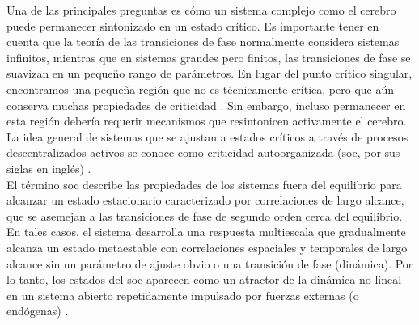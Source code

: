 Una de las principales preguntas es cómo un sistema complejo como el cerebro puede permanecer sintonizado en un estado crítico. Es importante tener en cuenta que la teoría de las transiciones de fase normalmente considera sistemas infinitos, mientras que en sistemas grandes pero finitos, las transiciones de fase se suavizan en un pequeño rango de parámetros. En lugar del punto crítico singular, encontramos una pequeña región que no es técnicamente crítica, pero que aún conserva muchas propiedades de criticidad \cite{moretti_griffiths_2013}. Sin embargo, incluso permanecer en esta región   debería requerir mecanismos que resintonicen activamente el cerebro. La idea general de sistemas que se ajustan a estados críticos a través de procesos descentralizados activos se conoce como criticidad autoorganizada (\gls{soc}, por sus siglas en inglés) \cite{bak_how_1996,christensen_evolution_1998,bornholdt_topological_2000,bornholdt_self-organized_2003}.\\

El término \gls{soc}  describe las propiedades de los sistemas fuera del equilibrio para alcanzar un estado estacionario caracterizado por correlaciones de largo alcance, que se asemejan a las transiciones de fase de segundo orden cerca del equilibrio. En tales casos, el sistema desarrolla una respuesta multiescala que gradualmente alcanza un estado metaestable con correlaciones espaciales y temporales de largo alcance sin un parámetro de ajuste obvio o una transición de fase (dinámica). Por lo tanto, los estados del  \gls{soc} aparecen como un atractor de la dinámica no lineal en un sistema abierto repetidamente impulsado por fuerzas externas (o endógenas) \cite{tadic_self-organised_2021,gross_adaptive_2007}. \\

